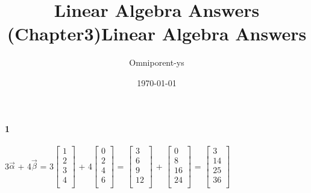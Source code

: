 \documentclass{ctexart}
\title{Linear Algebra Answers (Chapter3)}
\title{Linear Algebra Answers}
\author{Omniporent-ys}
\date{\today}
\begin{document}
\maketitle
    \paragraph{1}
        \begin{mdframed}
        3$\vec{\alpha}$ + 4$\vec{\beta}$
        = 3$\begin{bmatrix}
            1 \\
            2 \\
            3 \\
            4\\           
            \end{bmatrix}$
            + 4$\begin{bmatrix}
            0 \\
            2 \\
            4 \\
            6 \\           
            \end{bmatrix}$
            = $\begin{bmatrix}
            3 \\
            6 \\
            9 \\
            12 \\           
            \end{bmatrix}$
            +
            $\begin{bmatrix}
            0 \\
            8 \\
            16 \\
            24 \\           
            \end{bmatrix}$
            = 
            $\begin{bmatrix}
            3 \\
            14 \\
            25 \\
            36 \\           
            \end{bmatrix}$
        \end{mdframed}
\end{document}
